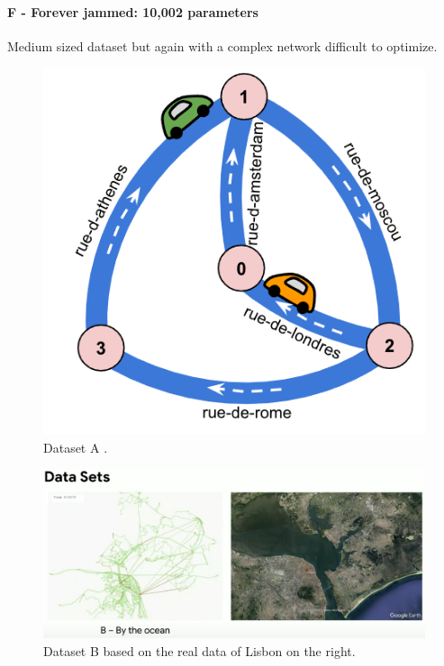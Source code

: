\paragraph{F - Forever jammed: 10,002 parameters} Medium sized dataset but again with a complex network difficult to optimize.

\begin{figure}
    \centering
    \includegraphics[width=.5\linewidth]{img/hashcode/figure5.png}
    \caption[Dataset A]{
        Dataset A \cite{google2023google}.
    }
    \label{fig:hashcode_dataset_a}
\end{figure}

\begin{figure}
    \centering
    \includegraphics[width=\linewidth]{img/screenshots/hashcode_datasets_b.png}
    \caption[Dataset B]{
        Dataset B based on the real data of Lisbon on the right\footnotemark.
    }
    \label{fig:hashcode_dataset_b}
\end{figure}


